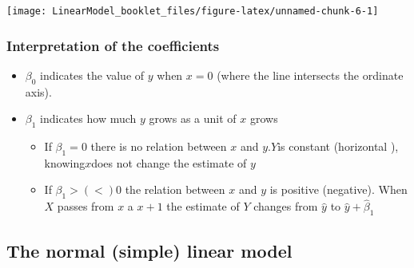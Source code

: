\documentclass[
]{article}
\newenvironment{Shaded}{\begin{snugshade}}{\end{snugshade}}
\newcommand{\DataTypeTok}[1]{\textcolor[rgb]{0.13,0.29,0.53}{#1}}
\newcommand{\DecValTok}[1]{\textcolor[rgb]{0.00,0.00,0.81}{#1}}
\newcommand{\KeywordTok}[1]{\textcolor[rgb]{0.13,0.29,0.53}{\textbf{#1}}}
\newcommand{\NormalTok}[1]{#1}
\newcommand{\OperatorTok}[1]{\textcolor[rgb]{0.81,0.36,0.00}{\textbf{#1}}}
\newcommand{\StringTok}[1]{\textcolor[rgb]{0.31,0.60,0.02}{#1}}
\providecommand{\tightlist}{%
  \setlength{\itemsep}{0pt}\setlength{\parskip}{0pt}}
\begin{document}
\begin{Shaded}
\end{Shaded}

\begin{center}\texttt{[image: LinearModel\_booklet\_files/figure-latex/unnamed-chunk-6-1]} \end{center}

\hypertarget{interpretation-of-the-coefficients}{%
\subsubsection{Interpretation of the
coefficients}\label{interpretation-of-the-coefficients}}

\begin{itemize}
\tightlist
\item
  \(\beta_0\) indicates the value of \(y\) when \(x=0\) (where the line
  intersects the ordinate axis).
\item
  \(\beta_1\) indicates how much \(y\) grows as a unit of \(x\) grows

  \begin{itemize}
  \tightlist
  \item
    If \(\beta_1=0\) there is no relation between \(x\) and
    \(y\).\(Y\)is constant (horizontal ), knowing\(x\)does not change
    the estimate of \(y\)
  \item
    If \(\beta_1> (<) 0\) the relation between \(x\) and \(y\) is
    positive (negative). When \(X\) passes from \(x\) a \(x + 1\) the
    estimate of \(Y\) changes from \(\hat{y}\) to
    \(\hat{y} + \hat{\beta}_1\)
  \end{itemize}
\end{itemize}

\hypertarget{the-normal-simple-linear-model}{%
\subsection{The normal (simple) linear
model}\label{the-normal-simple-linear-model}}
\end{document}

